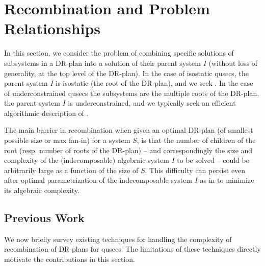 \section{Recombination and Problem Relationships}
\label{sec:recomb}
%
In this section, we consider the  problem of combining specific solutions of subsystems in a DR-plan into a solution of their parent system $I$ (without loss of generality, at the top level of the DR-plan). In the case of isostatic qusecs, the parent system $I$ is isostatic (the root of the DR-plan), and we seek . In the case of underconstrained qusecs the subsystems are the multiple roots of the DR-plan, the parent system $I$ is underconstrained, and we typically seek an efficient algorithmic description of .

The main barrier in recombination when given an optimal DR-plan  (of smallest possible size or max fan-in) for a system $S$,  is that the number of children of the root  (resp. number of roots of the DR-plan) -- and correspondingly the  size and complexity of the (indecomposable) algebraic system $I$ to be solved -- could be arbitrarily large as a function of the size of $S$. This difficulty can persist even after optimal parametrization of the indecomposable system $I$ as in \cite{sitharam2010optimized} to minimize its algebraic complexity.

\subsection{Previous Work}
We now briefly survey existing techniques for handling the complexity of recombination of DR-plans for qusecs. The limitations of these techniques directly motivate the contributions in this section.

